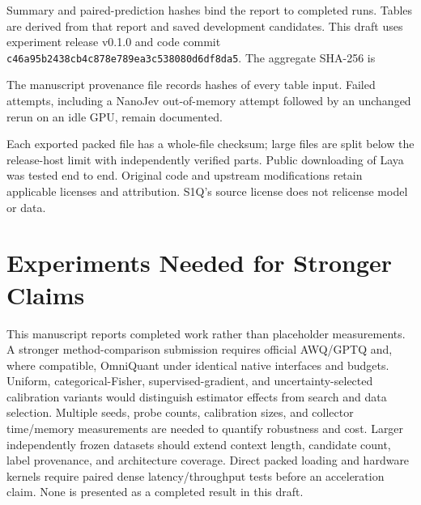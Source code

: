 \documentclass[10pt,twocolumn]{article}
\begin{document}
Summary and paired-prediction hashes bind the report to completed runs.
Tables are derived from that report and saved development candidates.
This draft uses experiment release v0.1.0 and code commit
\texttt{c46a95b2438cb4c878e789ea3c538080d6df8da5}.
The aggregate SHA-256 is
\begin{center}
\scriptsize\texttt{}
\end{center}
The manuscript provenance file records hashes of every table input.
Failed attempts, including a NanoJev out-of-memory attempt followed
by an unchanged rerun on an idle GPU, remain documented.

Each exported packed file has a whole-file checksum; large files
are split below the release-host limit with independently verified parts.
Public downloading of Laya was tested end to end.
Original code and upstream modifications retain applicable licenses
and attribution. S1Q's source license does not relicense model or data.

\section{Experiments Needed for Stronger Claims}
This manuscript reports completed work rather than placeholder measurements.
A stronger method-comparison submission requires official AWQ/GPTQ and,
where compatible, OmniQuant under identical native interfaces and budgets.
Uniform, categorical-Fisher, supervised-gradient, and uncertainty-selected
calibration variants would distinguish estimator effects from search and
data selection. Multiple seeds, probe counts, calibration sizes, and
collector time/memory measurements are needed to quantify robustness
and cost. Larger independently frozen datasets should extend context
length, candidate count, label provenance, and architecture coverage.
Direct packed loading and hardware kernels require paired dense
latency/throughput tests before an acceleration claim.
None is presented as a completed result in this draft.
\end{document}
